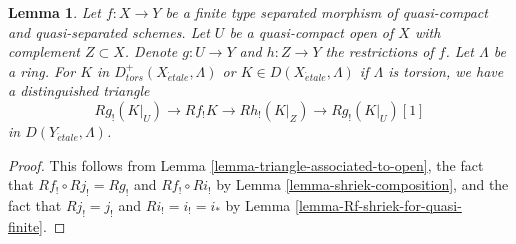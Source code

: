 \documentclass{stacks-project}
\theoremstyle{plain}
\newtheorem{lemma}[subsection]{Lemma}
\theoremstyle{definition}
\theoremstyle{remark}
\numberwithin{equation}{subsection}
\def\etale{{\acute{e}tale}}
\begin{document}
\begin{lemma}
\label{lemma-relative-triangle-associated-to-open}
Let $f : X \to Y$ be a finite type separated morphism of quasi-compact and
quasi-separated schemes. Let $U$ be a quasi-compact open of $X$ with
complement $Z \subset X$.  Denote $g : U \to Y$ and $h : Z \to Y$
the restrictions of $f$. Let $\Lambda$ be a ring.
For $K$ in $D^+_{tors}(X_\etale, \Lambda)$ or $K \in D(X_\etale, \Lambda)$
if $\Lambda$ is torsion, we have a distinguished triangle
$$
Rg_!(K|_U) \to
Rf_!K \to
Rh_!(K|_Z) \to
Rg_!(K|_U)[1]
$$
in $D(Y_\etale, \Lambda)$.
\end{lemma}

\begin{proof}
This follows from
Lemma \ref{lemma-triangle-associated-to-open},
the fact that $Rf_! \circ Rj_! = Rg_!$ and $Rf_! \circ Ri_!$ by
Lemma \ref{lemma-shriek-composition}, and the fact that
$Rj_! = j_!$ and $Ri_! = i_! = i_*$ by
Lemma \ref{lemma-Rf-shriek-for-quasi-finite}.
\end{proof}
\end{document}
